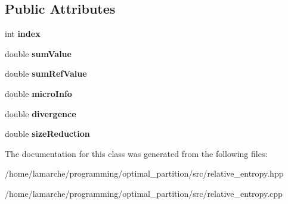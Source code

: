 \subsection*{Public Attributes}
\begin{DoxyCompactItemize}
\item 
\hypertarget{classRelativeObjectiveValue_aea16ecc724a19b7aa101645c1b79c214}{int {\bfseries index}}\label{classRelativeObjectiveValue_aea16ecc724a19b7aa101645c1b79c214}

\item 
\hypertarget{classRelativeObjectiveValue_a550566fd0f5c3ba5e23c1d2b3f8a222f}{double {\bfseries sum\-Value}}\label{classRelativeObjectiveValue_a550566fd0f5c3ba5e23c1d2b3f8a222f}

\item 
\hypertarget{classRelativeObjectiveValue_aae52cf2c1495424a38810d86fc0626a5}{double {\bfseries sum\-Ref\-Value}}\label{classRelativeObjectiveValue_aae52cf2c1495424a38810d86fc0626a5}

\item 
\hypertarget{classRelativeObjectiveValue_a70616b5d6c0d850db579b56be13c40c4}{double {\bfseries micro\-Info}}\label{classRelativeObjectiveValue_a70616b5d6c0d850db579b56be13c40c4}

\item 
\hypertarget{classRelativeObjectiveValue_a3b3689878505968dcb7869fe75a076e4}{double {\bfseries divergence}}\label{classRelativeObjectiveValue_a3b3689878505968dcb7869fe75a076e4}

\item 
\hypertarget{classRelativeObjectiveValue_a74505a2829b53ac5c401dddfeb8cba38}{double {\bfseries size\-Reduction}}\label{classRelativeObjectiveValue_a74505a2829b53ac5c401dddfeb8cba38}

\end{DoxyCompactItemize}


The documentation for this class was generated from the following files\-:\begin{DoxyCompactItemize}
\item 
/home/lamarche/programming/optimal\-\_\-partition/src/relative\-\_\-entropy.\-hpp\item 
/home/lamarche/programming/optimal\-\_\-partition/src/relative\-\_\-entropy.\-cpp\end{DoxyCompactItemize}
